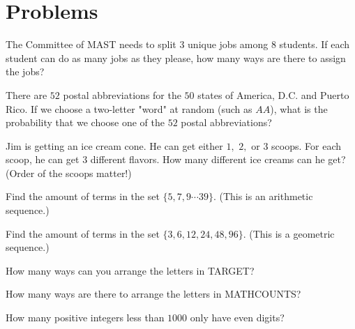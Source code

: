 \documentclass[blue,onecol]{shooting}
\begin{document}
\pagebreak

\section{Problems}



\begin{prob}[]{1}
The Committee of MAST needs to split $3$ unique jobs among $8$ students. If each student can do as many jobs as they please, how many ways are there to assign the jobs?
\end{prob}
    
\begin{prob}[]{1}
There are $52$ postal abbreviations for the $50$ states of America, D.C. and Puerto Rico. If we choose a two-letter "word" at random (such as $AA$), what is the probability that we choose one of the $52$ postal abbreviations?
\end{prob}

\begin{prob}[]{2}
Jim is getting an ice cream cone. He can get either $1,$ $2,$ or $3$ scoops. For each scoop, he can get $3$ different flavors. How many different ice creams can he get? (Order of the scoops matter!)
\end{prob}
    
\begin{prob}[]{1}
Find the amount of terms in the set $\{5,7,9\cdots 39\}.$ (This is an arithmetic sequence.)
\end{prob}
    
\begin{prob}[]{1}
Find the amount of terms in the set $\{3,6,12,24,48,96\}.$ (This is a geometric sequence.)
\end{prob}
    
\begin{prob}[]{1}
How many ways can you arrange the letters in TARGET?
\end{prob}

\begin{prob}[]{1}
How many ways are there to arrange the letters in MATHCOUNTS?
\end{prob}

\begin{prob}[]{3}
How many positive integers less than $1000$ only have even digits?
\end{prob}
\end{document}
